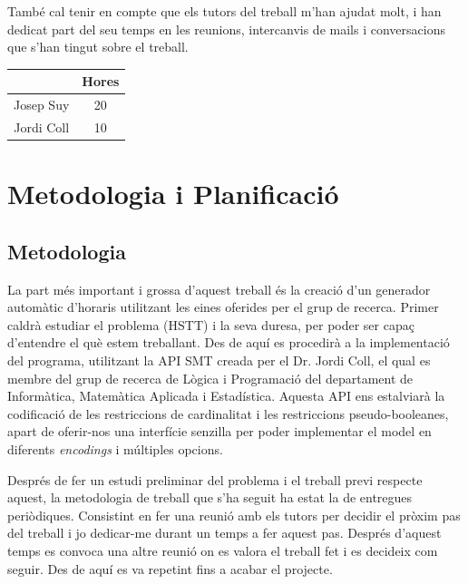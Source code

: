 \documentclass[11pt,a4paper,twoside]{report}
\begin{document}
   També cal tenir en compte que els tutors del treball m'han ajudat molt, i han dedicat part del seu temps en les reunions, intercanvis de mails i conversacions que s'han tingut sobre el treball.
   \begin{center}
    \begin{tabular}{|| c | c ||} 
    \hline
     & Hores \\ [0.5ex] 
    \hline\hline
    Josep Suy & 20 \\ [1ex] 
    Jordi Coll & 10 \\ [1ex] 
    \hline
   \end{tabular}
   \end{center}

  \chapter{Metodologia i Planificació}
  \section{Metodologia}
  La part més important i grossa d'aquest treball és la creació d'un generador automàtic d'horaris utilitzant les eines oferides per el grup de recerca. 
  Primer caldrà estudiar el problema (HSTT) i la seva duresa, per poder ser capaç d'entendre el què estem treballant.
  Des de aquí es procedirà a la implementació del programa, utilitzant la API SMT creada per el Dr. Jordi Coll, el qual es membre del grup de recerca de Lògica i Programació del departament de Informàtica, Matemàtica Aplicada i Estadística.
  Aquesta API ens estalviarà la codificació de les restriccions de cardinalitat i les restriccions pseudo-booleanes, 
  apart de oferir-nos una interfície senzilla per poder implementar el model en diferents \textit{encodings} i múltiples opcions.

  Després de fer un estudi preliminar del problema i el treball previ respecte aquest, la metodologia de treball que s'ha seguit ha estat la de entregues periòdiques. 
  Consistint en fer una reunió amb els tutors per decidir el pròxim pas del treball i jo dedicar-me durant un temps a fer aquest pas. Després d'aquest temps es convoca una altre reunió on es valora el treball fet i es decideix com seguir. 
  Des de aquí es va repetint fins a acabar el projecte.
\end{document}
